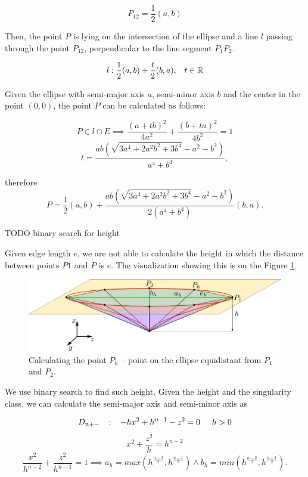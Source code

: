 $$P_{12} = \frac{1}{2}(a, b)$$

Then, the point $P$ is lying on the
intersection of the ellipse and a line $l$ passing through the point $P_{12}$, perpendicular to the
line segment $P_1P_2$.

$$l: \frac{1}{2}(a,b) + \frac{t}{2}(b,a), \hspace{3mm} t \in \mathbb{R}$$

Given the ellipse with semi-major axis $a$, 
semi-minor axis $b$ and the center in the point $(0, 0)$, the point $P$ can be 
calculated as follows:

$$P \in l \cap E \implies 
\frac{(a+tb)^2}{4a^2} + \frac{(b+ta)^2}{4b^2} = 1$$
$$t=\frac{ab(\sqrt{3a^4+2a^2b^2+3b^4}-a^2-b^2)}{a^4+b^4},$$

therefore 
$$P=\frac{1}{2}(a,b) + \frac{ab(\sqrt{3a^4+2a^2b^2+3b^4}-a^2-b^2)}{2(a^4+b^4)}(b,a).$$

TODO binary search for height

Given edge length $e$, we are not able to calculate the height in which the distance
between points $P1$ and $P$ is $e$. The visualization showing this is on the Figure \ref{img:17}.

\begin{figure}
    \centerline{\includegraphics[scale=0.5]{images/img17}}
    \caption[Calculating the point $P_h$]
    {Calculating the point $P_h$ -- point on the ellipse equidistant from $P_1$ and $P_2$.}
    \label{img:17}
\end{figure}

We use binary search to find such height.
Given the height and the singularity class, we can calculate the semi-major axis
and semi-minor axis as 

$$D_{n+-} \hspace{3mm} :\hspace{3mm}  -hx^2+h^{n-1}-z^2 = 0 \hspace{5mm} h>0$$
$$x^2 + \frac{z^2}{h} = h^{n-2}$$
$$\frac{x^2}{h^{n-2}} + \frac{z^2}{h^{n-1}} = 1 \implies a_h=max(h^\frac{n-2}{2}, h^\frac{n-1}{2}) \land b_h=min(h^\frac{n-2}{2}, h^\frac{n-1}{2}).$$

